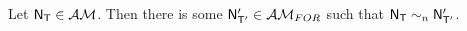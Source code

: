 %

\begin{thm} \label{approximatingEventModel}
Let $\evM_\evT \in \eventClass$.
Then there is some $\evM'_{\evT'} \in \forestClass$ such that $\evM_\evT \sim_n \evM'_{\evT'}$.
\end{thm}

